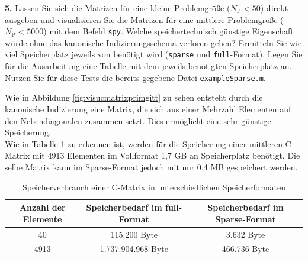 \documentclass[Protokollheft.tex]{subfiles}
\begin{document}
        \begin{framed}
	\noindent \textbf{5.} Lassen Sie sich die Matrizen für eine kleine Problemgröße ($N_{\text{P}}<50$) direkt
                    ausgeben und visualisieren Sie die Matrizen für eine mittlere
                    Problemgröße ($N_{\text{P}}<5000$) mit dem Befehl \lstinline{spy}. Welche speichertechnisch günstige
                    Eigenschaft würde ohne das kanonische Indizierungsschema verloren gehen?
                    Ermitteln Sie wie viel Speicherplatz jeweils von \matlab benötigt wird
                    (\lstinline{sparse} und \lstinline{full}-Format). Legen Sie für die Ausarbeitung eine Tabelle mit dem jeweils benötigten Speicherplatz an. Nutzen Sie für diese Tests die bereits gegebene Datei \lstinline{exampleSparse.m}.\label{exer:spyStorage}
\end{framed}
\noindent
 Wie in Abbildung \ref{fig:visucmatrixprimgitt} zu sehen entsteht durch die kanonische Indizierung eine Matrix, die sich aus einer Mehrzahl Elementen auf den Nebendiagonalen zusammen setzt. Dies ermöglicht eine sehr günstige Speicherung. \\
 Wie in Tabelle \ref{tbl:speicherCMatrix} zu erkennen ist, werden für die Speicherung einer mittleren C-Matrix mit 4913 Elementen im Vollformat 1,7 GB an Speicherplatz benötigt. Die selbe Matrix kann im Sparse-Format jedoch mit nur 0,4 MB gespeichert werden. 
 \begin{table}[h!]
	
 \begin{tabular}{|c|c|c|}
 
 	\hline 
 	Anzahl der Elemente& Speicherbedarf im full-Format &  Speicherbedarf im Sparse-Format\\ 
 	\hline 
 	40& 115.200 Byte & 3.632 Byte \\ 
 	\hline 
 	4913& 1.737.904.968 Byte& 466.736 Byte \\ 
 	\hline 	
 \end{tabular} 	
\caption{Speicherverbrauch einer C-Matrix in unterschiedlichen Speicherformaten}
\label{tbl:speicherCMatrix}
  \end{table}
\end{document}
